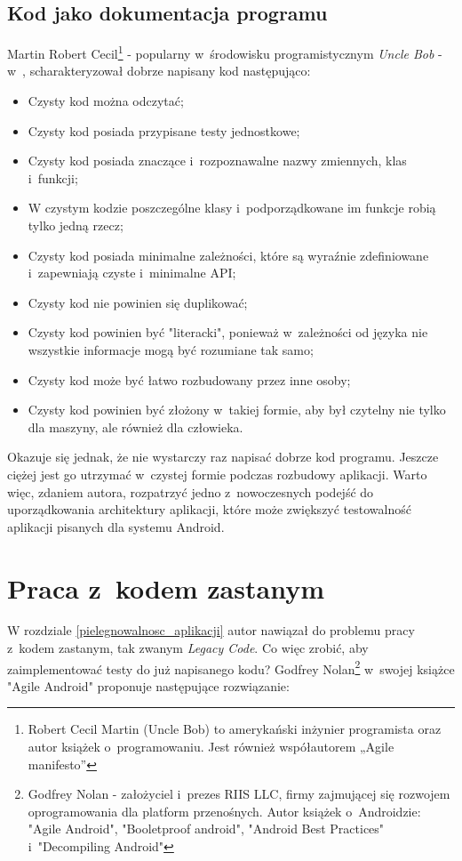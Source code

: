 \subsection{Kod jako dokumentacja programu}
\label{czysty_kod}
Martin Robert Cecil\footnote{Robert Cecil Martin (Uncle Bob) to amerykański inżynier programista oraz autor książek o~programowaniu. Jest również współautorem „Agile manifesto”} - popularny w~środowisku programistycznym \textit{Uncle Bob} - w~\cite{bib:cecil:clean_code}, scharakteryzował dobrze napisany kod następująco: 
\begin{itemize}
\item
Czysty kod można odczytać;
\item
Czysty kod posiada przypisane testy jednostkowe;
\item
Czysty kod posiada znaczące i~rozpoznawalne nazwy zmiennych, klas i~funkcji;
\item
W czystym kodzie poszczególne klasy i~podporządkowane im funkcje robią tylko jedną rzecz;
\item
Czysty kod posiada minimalne zależności, które są wyraźnie zdefiniowane i~zapewniają czyste i~minimalne API;
\item
Czysty kod nie powinien się duplikować;
\item
Czysty kod powinien być "literacki", ponieważ w~zależności od języka nie wszystkie informacje mogą być rozumiane tak samo;
\item
Czysty kod może być łatwo rozbudowany przez inne osoby;
\item
Czysty kod powinien być złożony w~takiej formie, aby był czytelny nie tylko dla maszyny, ale również dla człowieka.
\end{itemize}
Okazuje się jednak, że nie wystarczy raz napisać dobrze kod programu. Jeszcze ciężej jest go utrzymać w~czystej formie podczas rozbudowy aplikacji. Warto więc, zdaniem autora, rozpatrzyć jedno z~nowoczesnych podejść do uporządkowania architektury aplikacji, które może zwiększyć testowalność aplikacji pisanych dla systemu Android.

\section{Praca z~kodem zastanym}
\label{legacy_code}
W rozdziale \ref{pielegnowalnosc_aplikacji} autor nawiązał do problemu pracy z~kodem zastanym, tak zwanym \textit{Legacy Code}.
Co więc zrobić, aby zaimplementować testy do już napisanego kodu? Godfrey Nolan\footnote{Godfrey Nolan - założyciel i~prezes RIIS LLC, firmy zajmującej się rozwojem oprogramowania dla platform przenośnych. Autor książek o~Androidzie: "Agile Android", "Booletproof android", "Android Best Practices" i~"Decompiling Android"} w~swojej książce "Agile Android" \cite{bib:agile:android} proponuje następujące rozwiązanie:

